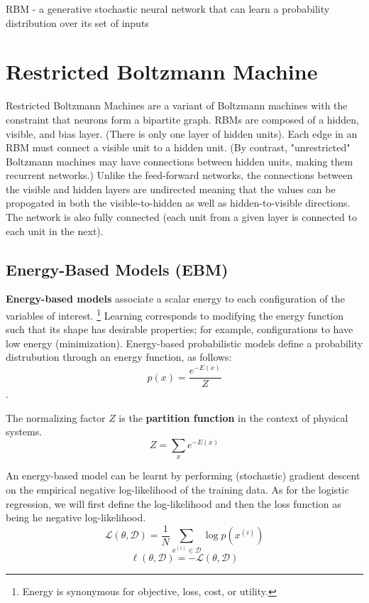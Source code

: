 \documentclass{article}
\begin{document}
RBM - a generative stochastic neural network that can learn a probability distribution over its set of inputs




\section{Restricted Boltzmann Machine}
Restricted Boltzmann Machines are a variant of Boltzmann machines with the constraint that neurons form a bipartite graph.  RBMs are composed of a hidden, visible, and bias layer.  (There is only one layer of hidden units).  Each edge in an RBM must connect a visible unit to a hidden unit.  (By contrast, "unrestricted" Boltzmann machines may have connections between hidden units, making them recurrent networks.)  Unlike the feed-forward networks, the connections between the visible and hidden layers are undirected meaning that the values can be propogated in both the visible-to-hidden as well as hidden-to-visible directions.  The network is also fully connected (each unit from a given layer is connected to each unit in the next).  \\


\subsection{Energy-Based Models (EBM)}

\textbf{Energy-based models} associate a scalar energy to each configuration of the variables of interest.  \footnote{Energy is synonymous for objective, loss, cost, or utility.}  Learning corresponds to modifying the energy function such that its shape has desirable properties; for example, configurations to have low energy (minimization).  Energy-based probabilistic models define a probability distrubution through an energy function, as follows:
$$p(x) = \frac{e^{-E(x)}}{Z}$$.

\noindent
The normalizing factor $Z$ is the \textbf{partition function} in the context of physical systems.
$$Z = \displaystyle \sum_x e^{-E(x)}$$

\noindent
An energy-based model can be learnt by performing (stochastic) gradient descent on the empirical negative log-likelihood of the training data.  As for the logistic regression, we will first define the log-likelihood and then the loss function as being he negative log-likelihood.
$$\mathcal{L}(\theta, \mathcal{D}) = \frac{1}{N} \displaystyle \sum_{x^{(i)} \in \mathcal{D}} \log p(x^(i))$$
$$\ell(\theta, \mathcal{D}) = -\mathcal{L}(\theta, \mathcal{D})$$
\end{document}
